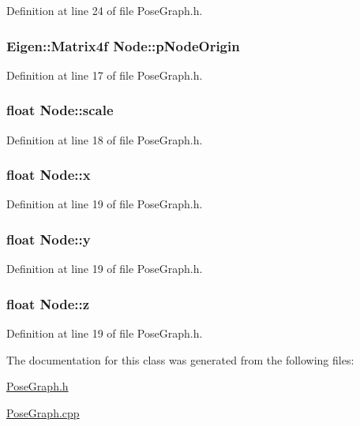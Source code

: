 \-Definition at line 24 of file \-Pose\-Graph.\-h.

\hypertarget{classNode_a440bd555088974667fa25d81788e5d7b}{
\subsubsection[{p\-Node\-Origin}]{\setlength{\rightskip}{0pt plus 5cm}\-Eigen\-::\-Matrix4f {\bf \-Node\-::p\-Node\-Origin}}}\label{classNode_a440bd555088974667fa25d81788e5d7b}


\-Definition at line 17 of file \-Pose\-Graph.\-h.

\hypertarget{classNode_a60234c70b368f633adc297393a429269}{
\subsubsection[{scale}]{\setlength{\rightskip}{0pt plus 5cm}float {\bf \-Node\-::scale}}}\label{classNode_a60234c70b368f633adc297393a429269}


\-Definition at line 18 of file \-Pose\-Graph.\-h.

\hypertarget{classNode_a3a6b88b82c51d21305656d01e3c53039}{
\subsubsection[{x}]{\setlength{\rightskip}{0pt plus 5cm}float {\bf \-Node\-::x}}}\label{classNode_a3a6b88b82c51d21305656d01e3c53039}


\-Definition at line 19 of file \-Pose\-Graph.\-h.

\hypertarget{classNode_a0658e9aa67d95daa5da3cca23b13f6de}{
\subsubsection[{y}]{\setlength{\rightskip}{0pt plus 5cm}float {\bf \-Node\-::y}}}\label{classNode_a0658e9aa67d95daa5da3cca23b13f6de}


\-Definition at line 19 of file \-Pose\-Graph.\-h.

\hypertarget{classNode_ab0676d1ca50996c875aad2e6773d758c}{
\subsubsection[{z}]{\setlength{\rightskip}{0pt plus 5cm}float {\bf \-Node\-::z}}}\label{classNode_ab0676d1ca50996c875aad2e6773d758c}


\-Definition at line 19 of file \-Pose\-Graph.\-h.



\-The documentation for this class was generated from the following files\-:\begin{DoxyCompactItemize}
\item 
\hyperlink{PoseGraph_8h}{\-Pose\-Graph.\-h}\item 
\hyperlink{PoseGraph_8cpp}{\-Pose\-Graph.\-cpp}\end{DoxyCompactItemize}
